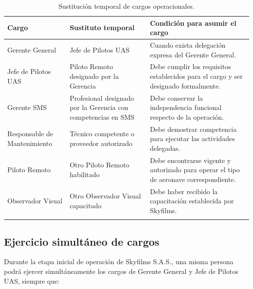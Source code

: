 \renewcommand{\arraystretch}{1.4}

\begin{longtable}{|p{4cm}|p{5cm}|p{5cm}|}

\hline

\textbf{Cargo} &
\textbf{Sustituto temporal} &
\textbf{Condición para asumir el cargo}

\\ \hline

Gerente General &
Jefe de Pilotos UAS &
Cuando exista delegación expresa del Gerente General.

\\ \hline

Jefe de Pilotos UAS &
Piloto Remoto designado por la Gerencia &
Debe cumplir los requisitos establecidos para el cargo y ser designado formalmente.

\\ \hline

Gerente SMS &
Profesional designado por la Gerencia con competencias en SMS &
Debe conservar la independencia funcional respecto de la operación.

\\ \hline

Responsable de Mantenimiento &
Técnico competente o proveedor autorizado &
Debe demostrar competencia para ejecutar las actividades delegadas.

\\ \hline

Piloto Remoto &
Otro Piloto Remoto habilitado &
Debe encontrarse vigente y autorizado para operar el tipo de aeronave correspondiente.

\\ \hline

Observador Visual &
Otro Observador Visual capacitado &
Debe haber recibido la capacitación establecida por Skyfilms.

\\ \hline

\caption{Sustitución temporal de cargos operacionales.}

\end{longtable}


\subsection*{Ejercicio simultáneo de cargos}

Durante la etapa inicial de operación de Skyfilms S.A.S., una misma persona podrá ejercer simultáneamente los cargos de Gerente General y Jefe de Pilotos UAS, siempre que:

